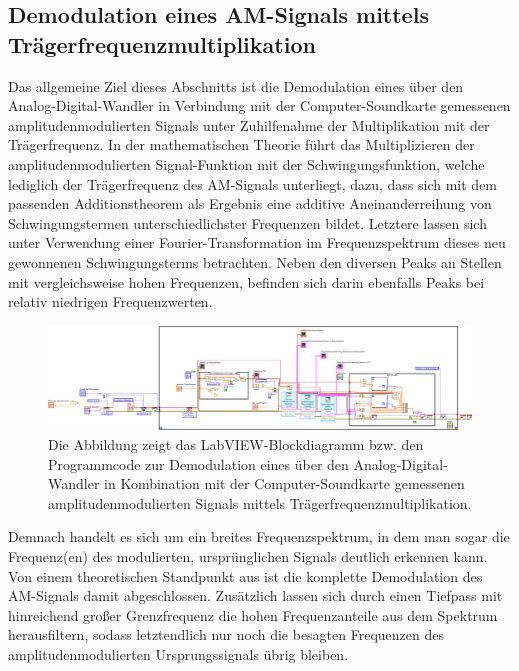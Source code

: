 \documentclass[
a4paper,
12pt,
pagesize,
ngerman
]{scrartcl}
\begin{document}

	
	\subsection{Demodulation eines AM-Signals mittels Trägerfrequenzmultiplikation} \label{DemodTraeger}
	
	Das allgemeine Ziel dieses Abschnitts ist die Demodulation eines über den Analog-Digital-Wandler in Verbindung mit der Computer-Soundkarte gemessenen amplitudenmodulierten Signals unter Zuhilfenahme der Multiplikation mit der Trägerfrequenz. 
	In der mathematischen Theorie führt das Multiplizieren der amplitudenmodulierten Signal-Funktion mit der Schwingungsfunktion, welche lediglich der Trägerfrequenz des AM-Signals unterliegt, dazu, dass sich mit dem passenden Additionstheorem als Ergebnis eine additive Aneinanderreihung von Schwingungstermen unterschiedlichster Frequenzen bildet. 
	Letztere lassen sich unter Verwendung einer Fourier-Transformation im Frequenzspektrum dieses neu gewonnenen Schwingungsterms betrachten. 
	Neben den diversen Peaks an Stellen mit vergleichsweise hohen Frequenzen, befinden sich darin ebenfalls Peaks bei relativ niedrigen Frequenzwerten.
		
	\begin{figure}[H]
		\centering
		\includegraphics[width=1.0\textwidth]{EIRE2018Dateien/Tag4/traegerMultOszi/Oszilloskop__modifiziertd}
		\caption{Die Abbildung zeigt das LabVIEW-Blockdiagramm bzw. den Programmcode zur Demodulation eines über den Analog-Digital-Wandler in Kombination mit der Computer-Soundkarte gemessenen amplitudenmodulierten Signals mittels Trägerfrequenzmultiplikation.}
		\label{MultiTraegerProgrammcode}
	\end{figure}

	\noindent Demnach handelt es sich um ein breites Frequenzspektrum, in dem man sogar die Frequenz(en) des modulierten, ursprünglichen Signals deutlich erkennen kann. 
	Von einem theoretischen Standpunkt aus ist die komplette Demodulation des AM-Signals damit abgeschlossen. 
	Zusätzlich lassen sich durch einen Tiefpass mit hinreichend großer Grenzfrequenz die hohen Frequenzanteile aus dem Spektrum herausfiltern, sodass letztendlich nur noch die besagten Frequenzen des amplitudenmodulierten Ursprungssignals übrig bleiben. 
	
\end{document}
